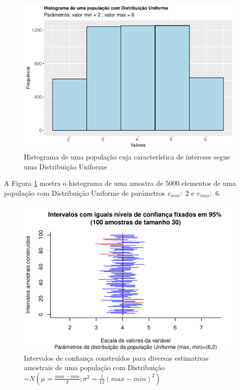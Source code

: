 \documentclass[
]{book}
\begin{document}
\begin{figure}

{\centering \includegraphics[width=1\linewidth]{apostila_files/figure-latex/fig46-1} 

}

\caption{Histograma de uma população cuja característica de interesse segue uma Distribuição Uniforme}\label{fig:fig46}
\end{figure}

\hfill\break

A Figura \ref{fig:fig46} mostra o histograma de uma amostra de 5000 elementos de uma população com Distribuição Uniforme de parâmetros \(v_{min}:\) 2 e \(v_{max}:\) 6.

\hfill\break

\hfill\break

\begin{figure}

{\centering \includegraphics[width=1\linewidth]{apostila_files/figure-latex/fig47-1} 

}

\caption{Intervalos de confiança construídos para diversas estimativas amostrais de uma população com Distribuição $\sim N (\mu= \frac{max-min}{2}; \sigma^2=\frac{1}{12}(max-min)^2)$}\label{fig:fig47}
\end{figure}
\end{document}
